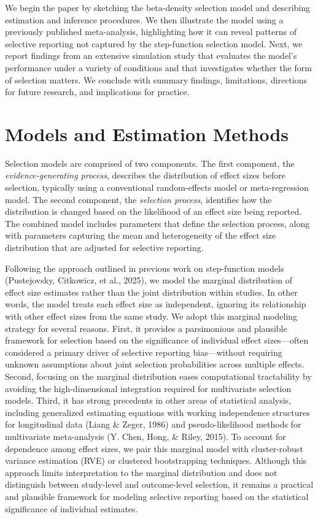 \documentclass[
  american,
  man, donotrepeattitle,floatsintext]{apa7}
\begin{document}
We begin the paper by sketching the beta-density selection model and describing estimation and inference procedures.
We then illustrate the model using a previously published meta-analysis, highlighting how it can reveal patterns of selective reporting not captured by the step-function selection model.
Next, we report findings from an extensive simulation study that evaluates the model's performance under a variety of conditions and that investigates whether the form of selection matters.
We conclude with summary findings, limitations, directions for future research, and implications for practice.

\section{Models and Estimation Methods}\label{model-and-estimation}

Selection models are comprised of two components. The first component, the \emph{evidence-generating process}, describes the distribution of effect sizes before selection, typically using a conventional random-effects model or meta-regression model.
The second component, the \emph{selection process}, identifies how the distribution is changed based on the likelihood of an effect size being reported.
The combined model includes parameters that define the selection process, along with parameters capturing the mean and heterogeneity of the effect size distribution that are adjusted for selective reporting.

Following the approach outlined in previous work on step-function models (Pustejovsky, Citkowicz, et al., 2025), we model the marginal distribution of effect size estimates rather than the joint distribution within studies.
In other words, the model treats each effect size as independent, ignoring its relationship with other effect sizes from the same study.
We adopt this marginal modeling strategy for several reasons.
First, it provides a parsimonious and plausible framework for selection based on the significance of individual effect sizes---often considered a primary driver of selective reporting bias---without requiring unknown assumptions about joint selection probabilities across multiple effects.
Second, focusing on the marginal distribution eases computational tractability by avoiding the high-dimensional integration required for multivariate selection models.
Third, it has strong precedents in other areas of statistical analysis, including generalized estimating equations with working independence structures for longitudinal data (Liang \& Zeger, 1986) and pseudo-likelihood methods for multivariate meta-analysis (Y. Chen, Hong, \& Riley, 2015).
To account for dependence among effect sizes, we pair this marginal model with cluster-robust variance estimation (RVE) or clustered bootstrapping techniques.
Although this approach limits interpretation to the marginal distribution and does not distinguish between study-level and outcome-level selection, it remains a practical and plausible framework for modeling selective reporting based on the statistical significance of individual estimates.
\end{document}

